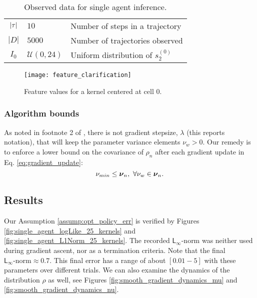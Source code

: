     \begin{table}[H]
	\centering
	\begin{tabular}{c|l l}
		$|\tau|$ & $10$ & Number of steps in a trajectory \\
		$|D|$ & $5000$ & Number of trajectories observed \\
		$I_0$ & $\mathcal{U}(0,24)$ & Uniform distribution of $s_2^{(0)}$ \\
	\end{tabular}
	\caption{Observed data for single agent inference.}
	\label{table:single_agent_data_set}
\end{table}

    \begin{figure}[h]
        \texttt{[image: feature\_clarification]}
        \caption{Feature values for a kernel centered at cell $0$.}
        \label{fig:kernel_visualization}
    \end{figure}

    \subsubsection{Algorithm bounds}

    As noted in footnote 2 of \cite{williams1992simple}, there is not gradient stepsize, $\lambda$ (this reports notation), that will keep the parameter variance elements $\nu_w >0$. Our remedy is to enforce a lower bound on the covariance of $\rho_n$ after each gradient update in Eq. \ref{eq:gradient_update}:
    \begin{equation}\label{eq:param_var_bounds}
    \nu_{min} \leq \boldsymbol{\mathbb{\nu}}_n,\ \forall \nu_w \in \boldsymbol{\mathbb{\nu}}_n.
    \end{equation}

	\subsection{Results}\label{sec:single_agent_25K_results}
	Our Assumption
    \ref{assump:opt_policy_err} is verified by Figures \ref{fig:single_agent_logLike_25_kernels} and
    \ref{fig:single_agent_L1Norm_25_kernels}. The recorded $\mathsf{L}_{\infty}$-norm was neither used during gradient ascent,
    nor as a termination criteria. Note that the final $\mathsf{L}_\infty\text{-norm} \approx 0.7$. This final
    error has a range of about $[0.01-5]$ with these parameters over different trials.	We can also examine the dynamics of the distribution $\rho$ as well, see Figures \ref{fig:smooth_gradient_dynamics_mu} and \ref{fig:smooth_gradient_dynamics_nu}.
    
